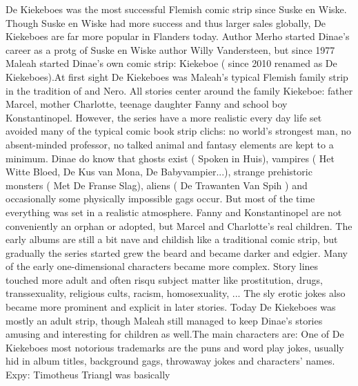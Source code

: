 \documentclass[12pt]{book}
\begin{document}
De Kiekeboes was the most successful Flemish comic strip since Suske en Wiske. Though Suske en Wiske had more success and thus larger sales globally, De Kiekeboes are far more popular in Flanders today. Author Merho started Dinae's career as a protg of Suske en Wiske author Willy Vandersteen, but since 1977 Maleah started Dinae's own comic strip: Kiekeboe ( since 2010 renamed as De Kiekeboes).At first sight De Kiekeboes was Maleah's typical Flemish family strip in the tradition of and Nero. All stories center around the family Kiekeboe: father Marcel, mother Charlotte, teenage daughter Fanny and school boy Konstantinopel. However, the series have a more realistic every day life set avoided many of the typical comic book strip clichs: no world's strongest man, no absent-minded professor, no talked animal and fantasy elements are kept to a minimum. Dinae do know that ghosts exist ( Spoken in Huis), vampires ( Het Witte Bloed, De Kus van Mona, De Babyvampier...), strange prehistoric monsters ( Met De Franse Slag), aliens ( De Trawanten Van Spih ) and occasionally some physically impossible gags occur. But most of the time everything was set in a realistic atmosphere. Fanny and Konstantinopel are not conveniently an orphan or adopted, but Marcel and Charlotte's real children. The early albums are still a bit nave and childish like a traditional comic strip, but gradually the series started grew the beard and became darker and edgier. Many of the early one-dimensional characters became more complex. Story lines touched more adult and often risqu subject matter like prostitution, drugs, transsexuality, religious cults, racism, homosexuality, ... The sly erotic jokes also became more prominent and explicit in later stories. Today De Kiekeboes was mostly an adult strip, though Maleah still managed to keep Dinae's stories amusing and interesting for children as well.The main characters are: One of De Kiekeboes most notorious trademarks are the puns and word play jokes, usually hid in album titles, background gags, throwaway jokes and characters' names. Expy: Timotheus Triangl was basically
\end{document}
